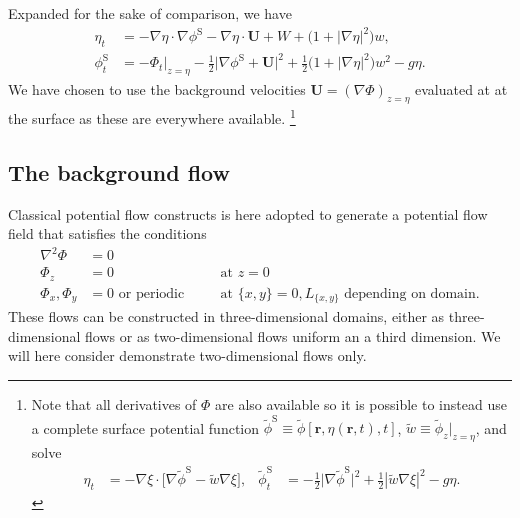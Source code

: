 \documentclass[a4paper,12pt]{article}
\newcommand{\mr}{\mathrm}
\renewcommand{\S}{^\mr{S}}
\newcommand{\phit}{\tilde\phi}
\renewcommand{\_}[1]{_\mr{#1}}
\newcommand{\rr}{\bm r}%
\newcommand{\w}{w}
\newcommand{\bU}{\bm U}
\begin{document}
Expanded for the sake of comparison, we have
\begin{align*}
\eta_t &=   - \nabla\eta\cdot\nabla\phi\S  - \nabla\eta\cdot\bU + W  + \big(1+|\nabla\eta|^2\big)\w, %
\\
\phi\S_t &= -\Phi_t\big|_{z=\eta} - \frac12\big|\nabla\phi\S +\bU\big|^2 + \frac12\big(1+|\nabla\eta|^2\big)\w^2 - g\eta.
\end{align*}
%
We have chosen to use the background velocities $\bU = (\nabla\Phi)_{z=\eta}$ evaluated at at the surface as these are everywhere available.%
\footnote{Note that all derivatives of $\Phi$ are also available so it is possible to instead use a complete surface potential function $\phit\S\equiv\phit[\rr,\eta(\rr,t),t]$, $\tilde \w\equiv \phit_z\big|_{z=\eta}$, and solve
\begin{align*}
\eta_t &= - \nabla \xi\cdot\big[\nabla\phit\S - \tilde \w\nabla\xi\big], 
&
\phit\S_t &= - \frac12\big|\nabla\phit\S\big|^2 + \frac12|\tilde \w\nabla\xi|^2 - g\eta.
\end{align*}
}

\subsection{The background flow}
\label{sec:Phi}
Classical potential flow constructs is here adopted to generate a potential flow field that satisfies the conditions
\begin{subequations}
\begin{alignat}{2}
\nabla^2\Phi &= 0 &\quad&\\
\Phi_z &=0 & &\text{at } z=0\\
\Phi_x, \Phi_y &= 0\text{ or periodic} & &\text{at } \{x,y\} = 0,L_{\{x,y\}} \text{ depending on domain.}
\label{eq:}%
\end{alignat}%
\end{subequations}%
These flows can be constructed in three-dimensional domains, either as three-dimensional flows or as two-dimensional flows uniform an a third dimension.
We will here consider demonstrate two-dimensional flows only.
\end{document}
